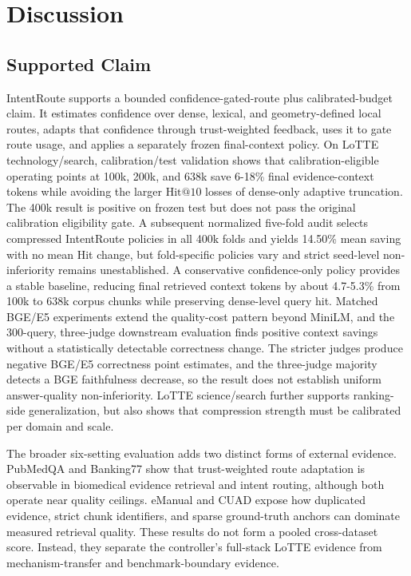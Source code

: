 
\section{Discussion}
\label{sec:07-discussion:discussion}

\subsection{Supported Claim}
\label{sec:07-discussion:supported-claim}

IntentRoute supports a bounded confidence-gated-route plus calibrated-budget claim. It estimates confidence over dense, lexical, and geometry-defined local routes, adapts that confidence through trust-weighted feedback, uses it to gate route usage, and applies a separately frozen final-context policy. On LoTTE technology/search, calibration/test validation shows that calibration-eligible operating points at 100k, 200k, and 638k save 6-18\% final evidence-context tokens while avoiding the larger $\mathrm{Hit@10}$ losses of dense-only adaptive truncation. The 400k result is positive on frozen test but does not pass the original calibration eligibility gate. A subsequent normalized five-fold audit selects compressed IntentRoute policies in all 400k folds and yields 14.50\% mean saving with no mean Hit change, but fold-specific policies vary and strict seed-level non-inferiority remains unestablished. A conservative confidence-only policy provides a stable baseline, reducing final retrieved context tokens by about 4.7-5.3\% from 100k to 638k corpus chunks while preserving dense-level query hit. Matched BGE/E5 experiments extend the quality-cost pattern beyond MiniLM, and the 300-query, three-judge downstream evaluation finds positive context savings without a statistically detectable correctness change. The stricter judges produce negative BGE/E5 correctness point estimates, and the three-judge majority detects a BGE faithfulness decrease, so the result does not establish uniform answer-quality non-inferiority. LoTTE science/search further supports ranking-side generalization, but also shows that compression strength must be calibrated per domain and scale.

The broader six-setting evaluation adds two distinct forms of external evidence. PubMedQA and Banking77 show that trust-weighted route adaptation is observable in biomedical evidence retrieval and intent routing, although both operate near quality ceilings. eManual and CUAD expose how duplicated evidence, strict chunk identifiers, and sparse ground-truth anchors can dominate measured retrieval quality. These results do not form a pooled cross-dataset score. Instead, they separate the controller's full-stack LoTTE evidence from mechanism-transfer and benchmark-boundary evidence.

